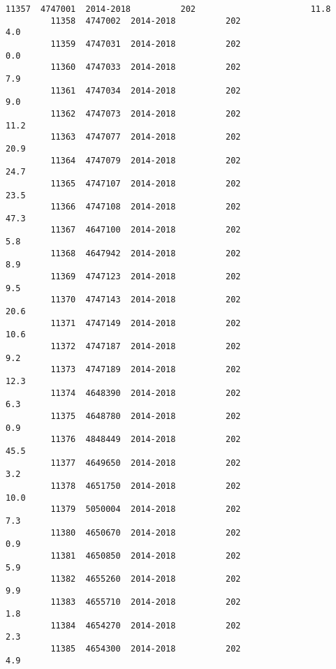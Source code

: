 \documentclass[11pt]{article}
\begin{document}
\begin{Verbatim}[commandchars=\\\{\}]
         11357  4747001  2014-2018          202                       11.8   
         11358  4747002  2014-2018          202                        4.0   
         11359  4747031  2014-2018          202                        0.0   
         11360  4747033  2014-2018          202                        7.9   
         11361  4747034  2014-2018          202                        9.0   
         11362  4747073  2014-2018          202                       11.2   
         11363  4747077  2014-2018          202                       20.9   
         11364  4747079  2014-2018          202                       24.7   
         11365  4747107  2014-2018          202                       23.5   
         11366  4747108  2014-2018          202                       47.3   
         11367  4647100  2014-2018          202                        5.8   
         11368  4647942  2014-2018          202                        8.9   
         11369  4747123  2014-2018          202                        9.5   
         11370  4747143  2014-2018          202                       20.6   
         11371  4747149  2014-2018          202                       10.6   
         11372  4747187  2014-2018          202                        9.2   
         11373  4747189  2014-2018          202                       12.3   
         11374  4648390  2014-2018          202                        6.3   
         11375  4648780  2014-2018          202                        0.9   
         11376  4848449  2014-2018          202                       45.5   
         11377  4649650  2014-2018          202                        3.2   
         11378  4651750  2014-2018          202                       10.0   
         11379  5050004  2014-2018          202                        7.3   
         11380  4650670  2014-2018          202                        0.9   
         11381  4650850  2014-2018          202                        5.9   
         11382  4655260  2014-2018          202                        9.9   
         11383  4655710  2014-2018          202                        1.8   
         11384  4654270  2014-2018          202                        2.3   
         11385  4654300  2014-2018          202                        4.9   
         

\end{Verbatim}
\end{document}
